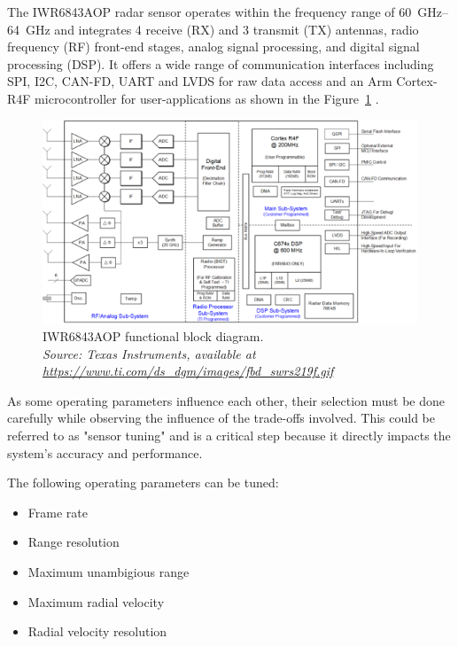 \vspace{3\baselineskip}
\par
The IWR6843AOP radar sensor operates within the frequency range of \SIrange{60}{64}{\giga\hertz} and integrates 4 receive (RX) and 3 transmit (TX) antennas, radio frequency (RF) front-end stages, analog signal processing, and digital signal processing (DSP).
It offers a wide range of communication interfaces including SPI, I2C, CAN-FD, UART and LVDS for raw data access and an Arm Cortex-R4F microcontroller for user-applications as shown in the Figure~\ref{fig:IWR6843AOP_internal} \cite{dev_board_page}.

\begin{figure}[!htbp]
    \centering
    \includegraphics[width=1.0\linewidth]{images/blockdiagram.png}
    \caption{IWR6843AOP functional block diagram.\\
    \textit{Source: Texas Instruments, available at \url{https://www.ti.com/ds_dgm/images/fbd_swrs219f.gif}}}
    \label{fig:IWR6843AOP_internal}
\end{figure}

As some operating parameters influence each other, their selection must be done carefully while observing the influence of the trade-offs involved.
This could be referred to as "sensor tuning" and is a critical step because it directly impacts the system's accuracy and performance.

The following operating parameters can be tuned:
\begin{itemize}
    \item Frame rate
    \item Range resolution
    \item Maximum unambigious range
    \item Maximum radial velocity
    \item Radial velocity resolution
\end{itemize}

